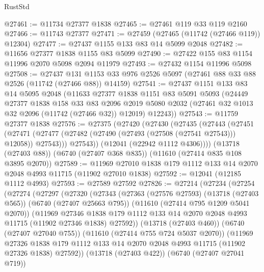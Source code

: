 \begin{lexlean}{RustStd}
\begin{coremodule}
@27461 := @11734 @27377 @1838
@27465 := @27461 @119 @33 @119 @2160
@27466 := @11743 @27377
@27471 := @27459 (@27465 (@11742 (@27466 @119)) @12304)
@27477 := @27437 @1155 @133 @83 @14 @5099 @2048
@27482 := @11656 @27377 @1838 @1155 @83 @5099
@27490 := @27422 @155 @83 @1154 @11996 @2070 @5098 @2094 @11979
@27493 := @27432 @1154 @11996 @5098
@27508 := @27437
    @131
    @1153
    @33
    @976
    @2526
    @5097
    (@27461 @88 @33 @88 @2526 (@11742 (@27466 @88)) @14159)
@27541 := @27437
    @1151
    @133
    @83
    @14
    @5095
    @2048
    (@11633
      @27377
      @1838
      @1151
      @83
      @5091
      @5093
      (@24449
        @27377
        @1838
        @158
        @33
        @83
        @2096
        @2019
        @5080
        @2032
        (@27461 @32 @1013 @32 @2096 (@11742 (@27466 @32)) @12019)
        @12243))
@27543 := @11759 @27377 @1838
@27576 := @27375
    (@27420
      (@27430
        (@27435
          (@27443
            (@27451
              (@27471 (@27477 (@27482 (@27490 (@27493 (@27508 (@27541 @27543))) @12058)) @27543)))
            @27543))
        (@12041 (@22942 @1112 @4306))))
    (@13718 (@27403 @88))
    (@6740 (@27407 @368 @835))
    (@11610 (@27414 @835 @108 @3895 @2070))
@27589 := @11969 @27010 @1838 @179 @1112 @133 @14 @2070 @2048 @4993 @11715 (@11902 @27010 @1838)
@27592 := @12041 (@12185 @1112 @4993)
@27593 := @27589 @27592
@27826 := @27214
    (@27234
      (@27254
        (@27274
          (@27297
            (@27320
              (@27343
                (@27363
                  (@27576 @27593)
                  (@13718 (@27403 @565))
                  (@6740 (@27407 @25663 @795))
                  (@11610 (@27414 @795 @1209 @5041 @2070))
                  (@11969
                    @27346
                    @1838
                    @179
                    @1112
                    @133
                    @14
                    @2070
                    @2048
                    @4993
                    @11715
                    (@11902 @27346 @1838)
                    @27592))
                (@13718 (@27403 @460))
                (@6740 (@27407 @27040 @755))
                (@11610 (@27414 @755 @724 @5037 @2070))
                (@11969
                  @27326
                  @1838
                  @179
                  @1112
                  @133
                  @14
                  @2070
                  @2048
                  @4993
                  @11715
                  (@11902 @27326 @1838)
                  @27592))
              (@13718 (@27403 @422))
              (@6740 (@27407 @27041 @719))

\end{coremodule}
\end{lexlean}
